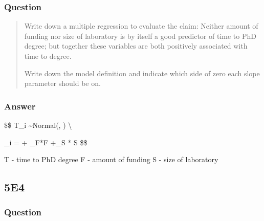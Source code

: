 \documentclass[
]{book}
\begin{document}
\hypertarget{question-47}{%
\subsubsection*{Question}\label{question-47}}

\begin{quote}
Write down a multiple regression to evaluate the claim: Neither amount of funding nor size of laboratory is by itself a good predictor of time to PhD degree; but together these variables are both positively associated with time to degree.

Write down the model definition and indicate which side of zero each slope parameter should be on.
\end{quote}

\hypertarget{answer-47}{%
\subsubsection*{Answer}\label{answer-47}}

\$\$
T\_i \sim Normal(\mu, \sigma) \textbackslash{}

\mu\_i = \alpha + \beta\_F*F +\beta\_S * S
\$\$

T - time to PhD degree
F - amount of funding
S - size of laboratory

\hypertarget{e4-3}{%
\subsection*{5E4}\label{e4-3}}

\hypertarget{question-48}{%
\subsubsection*{Question}\label{question-48}}
\end{document}
